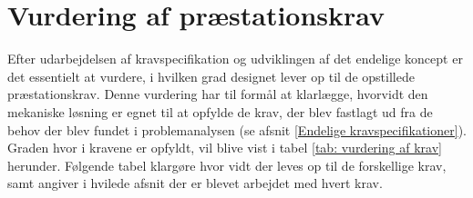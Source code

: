 \section{Vurdering af præstationskrav} \label{vurdering af krav}
Efter udarbejdelsen af kravspecifikation og udviklingen af det endelige koncept er det essentielt at vurdere, i hvilken grad designet lever op til de opstillede præstationskrav. Denne vurdering har til formål at klarlægge, hvorvidt den mekaniske løsning er egnet til at opfylde de krav, der blev fastlagt ud fra de behov der blev fundet i problemanalysen (se afsnit \ref{Endelige kravspecifikationer}). Graden hvor i kravene er opfyldt, vil blive vist i tabel \ref{tab: vurdering af krav} herunder. Følgende tabel klargøre hvor vidt der leves op til de forskellige krav, samt angiver i hvilede afsnit der er blevet arbejdet med hvert krav. 

